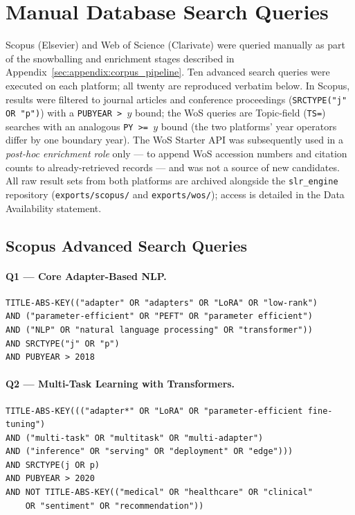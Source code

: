 
\section[\appendixname~\thesection]{Manual Database Search Queries}
\label{app:db_queries}

Scopus (Elsevier) and Web of Science (Clarivate) were queried manually as part of the
snowballing and enrichment stages described in Appendix~\ref{sec:appendix:corpus_pipeline}.
Ten advanced search queries were executed on each platform; all twenty are
reproduced verbatim below. In Scopus, results were filtered to journal articles
and conference proceedings (\texttt{SRCTYPE("j" OR "p")}) with a
\texttt{PUBYEAR > $y$} bound; the WoS queries are Topic-field (\texttt{TS=})
searches with an analogous \texttt{PY >= $y$} bound (the two platforms' year
operators differ by one boundary year).
The WoS Starter API was subsequently used in a \textit{post-hoc enrichment role} only
--- to append WoS accession numbers and citation counts to already-retrieved records ---
and was not a source of new candidates. All raw result sets from both platforms are
archived alongside the \texttt{slr\_engine} repository (\texttt{exports/scopus/} and
\texttt{exports/wos/}); access is detailed in the Data Availability statement.

\subsection*{Scopus Advanced Search Queries}
\label{app:db_queries:scopus}

\paragraph{Q1 — Core Adapter-Based NLP.}
\begin{verbatim}
TITLE-ABS-KEY(("adapter" OR "adapters" OR "LoRA" OR "low-rank")
AND ("parameter-efficient" OR "PEFT" OR "parameter efficient")
AND ("NLP" OR "natural language processing" OR "transformer"))
AND SRCTYPE("j" OR "p")
AND PUBYEAR > 2018
\end{verbatim}

\paragraph{Q2 — Multi-Task Learning with Transformers.}
\begin{verbatim}
TITLE-ABS-KEY((("adapter*" OR "LoRA" OR "parameter-efficient fine-tuning")
AND ("multi-task" OR "multitask" OR "multi-adapter")
AND ("inference" OR "serving" OR "deployment" OR "edge")))
AND SRCTYPE(j OR p)
AND PUBYEAR > 2020
AND NOT TITLE-ABS-KEY(("medical" OR "healthcare" OR "clinical"
    OR "sentiment" OR "recommendation"))
\end{verbatim}

